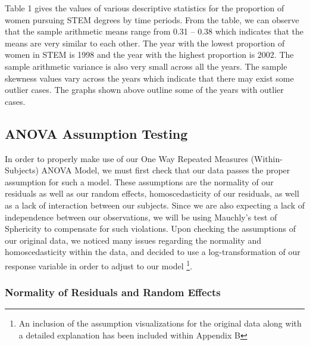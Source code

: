 \documentclass[]{article}
\begin{document}
Table 1 gives the values of various descriptive statistics for the
proportion of women pursuing STEM degrees by time periods. From the
table, we can observe that the sample arithmetic means range from 0.31
-- 0.38 which indicates that the means are very similar to each other.
The year with the lowest proportion of women in STEM is 1998 and the
year with the highest proportion is 2002. The sample arithmetic variance
is also very small across all the years. The sample skewness values vary
across the years which indicate that there may exist some outlier cases.
The graphs shown above outline some of the years with outlier cases.

\subsection{ANOVA Assumption Testing}\label{anova-assumption-testing}

In order to properly make use of our One Way Repeated Measures
(Within-Subjects) ANOVA Model, we must first check that our data passes
the proper assumption for such a model. These assumptions are the
normality of our residuals as well as our random effects,
homoscedasticity of our residuals, as well as a lack of interaction
between our subjects. Since we are also expecting a lack of independence
between our observations, we will be using Mauchly's test of Sphericity
to compensate for such violations. Upon checking the assumptions of our
original data, we noticed many issues regarding the normality and
homoscedasticity within the data, and decided to use a
log-transformation of our response variable in order to adjust to our
model
\footnote{An inclusion of the assumption visualizations for the original data along with a detailed explanation has been included within Appendix B}.

\clearpage

\subsubsection{Normality of Residuals and Random
Effects}\label{normality-of-residuals-and-random-effects}
\end{document}
